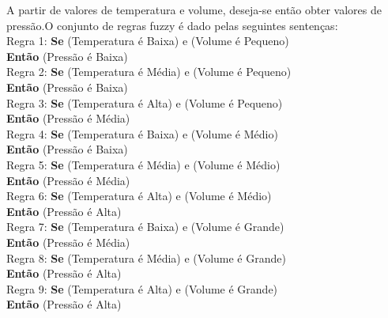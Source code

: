 \documentclass{report}
\begin{document}
A partir de valores de temperatura e volume, deseja-se então obter valores de pressão.O conjunto de regras
fuzzy é dado pelas seguintes sentenças:\\
Regra 1: \textbf{Se} (Temperatura é Baixa) e (Volume é Pequeno)\\
\textbf{Então} (Pressão é Baixa)\\
Regra 2: \textbf{Se} (Temperatura é Média) e (Volume é Pequeno)\\
\textbf{Então} (Pressão é Baixa)\\
Regra 3: \textbf{Se} (Temperatura é Alta) e (Volume é Pequeno)\\
\textbf{Então} (Pressão é Média)\\
Regra 4: \textbf{Se} (Temperatura é Baixa) e (Volume é Médio)\\
\textbf{Então} (Pressão é Baixa)\\
Regra 5: \textbf{Se} (Temperatura é Média) e (Volume é Médio)\\
\textbf{Então} (Pressão é Média)\\
Regra 6: \textbf{Se} (Temperatura é Alta) e (Volume é Médio)\\
\textbf{Então} (Pressão é Alta)\\
Regra 7: \textbf{Se} (Temperatura é Baixa) e (Volume é Grande)\\
\textbf{Então} (Pressão é Média)\\
Regra 8: \textbf{Se} (Temperatura é Média) e (Volume é Grande)\\
\textbf{Então} (Pressão é Alta)\\
Regra 9: \textbf{Se} (Temperatura é Alta) e (Volume é Grande)\\
\textbf{Então} (Pressão é Alta)\\
\end{document}
